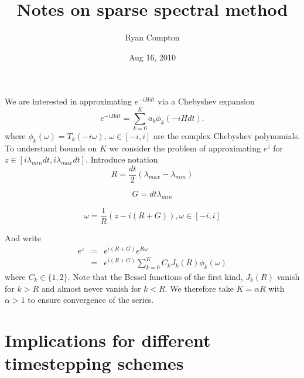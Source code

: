 \documentclass[12pt]{amsart}
\title{Notes on sparse spectral method}
\author{Ryan Compton}
\date{Aug 16, 2010}
\theoremstyle{remark}
\begin{document}
\maketitle

We are interested in approximating $e^{-iHdt}$ via a Chebyshev expansion
$$
e^{-iHdt} = \sum_{k=0}^K a_k \phi_k (-iHdt).
$$
where $\phi_k(\omega) = T_k(-i\omega)$, $\omega \in [-i,i]$ are the complex Chebyshev polynomials. To understand bounds on $K$ we consider the problem of approximating $e^z$ for $z \in [i \lambda_{min} dt, i \lambda_{max} dt]$. Introduce notation
$$
R = \frac{dt}{2}(\lambda_{max} - \lambda_{min})
$$

$$
G = dt \lambda_{min}
$$

$$
\omega = \frac{1}{R}(z - i(R+G)),\omega \in [-i,i]
$$

And write
\begin{eqnarray}
e^{z} & = & e^{i(R+G)}e^{R\omega} \\
& = & e^{i(R+G)}\sum_{k=0}^K C_k J_k(R) \phi_k(\omega)
\end{eqnarray}
where $C_k \in \{1,2 \} $. Note that the Bessel functions of the first kind, $J_k(R)$ vanish for $k>R$ and almost never vanish for $k<R$. We therefore take $K= \alpha R$ with $\alpha >1$ to ensure convergence of the series.


\section{Implications for different timestepping schemes}








\end{document}
